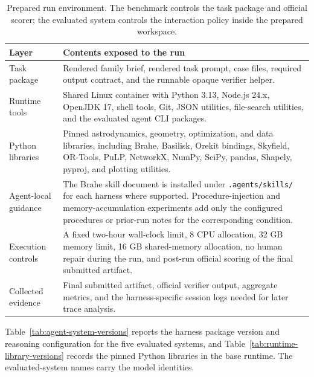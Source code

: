 \documentclass[]{mosi}
\begin{document}
\begin{table}[!t]
\centering
\footnotesize
\setlength{\tabcolsep}{4pt}
\begin{tabular}{>{\raggedright\arraybackslash}p{}>{\raggedright\arraybackslash}p{}}
\hline
\textbf{Layer} & \textbf{Contents exposed to the run} \\
\hline
Task package & Rendered family brief, rendered task prompt, case files, required output contract, and the runnable opaque verifier helper. \\
Runtime tools & Shared Linux container with Python 3.13, Node.js 24.x, OpenJDK 17, shell tools, Git, JSON utilities, file-search utilities, and the evaluated agent CLI packages. \\
Python libraries & Pinned astrodynamics, geometry, optimization, and data libraries, including Brahe, Basilisk, Orekit bindings, Skyfield, OR-Tools, PuLP, NetworkX, NumPy, SciPy, pandas, Shapely, pyproj, and plotting utilities. \\
Agent-local guidance & The Brahe skill document is installed under \texttt{.agents/skills/} for each harness where supported. Procedure-injection and memory-accumulation experiments add only the configured procedures or prior-run notes for the corresponding condition. \\
Execution controls & A fixed two-hour wall-clock limit, 8 CPU allocation, 32 GB memory limit, 16 GB shared-memory allocation, no human repair during the run, and post-run official scoring of the final submitted artifact. \\
Collected evidence & Final submitted artifact, official verifier output, aggregate metrics, and the harness-specific session logs needed for later trace analysis. \\
\hline
\end{tabular}
\caption{Prepared run environment. The benchmark controls the task package and official scorer; the evaluated system controls the interaction policy inside the prepared workspace.}
\label{tab:workspace-environment}
\end{table}

Table~\ref{tab:agent-system-versions} reports the harness package version and reasoning configuration for the five evaluated systems, and Table~\ref{tab:runtime-library-versions} records the pinned Python libraries in the base runtime. The evaluated-system names carry the model identities.
\end{document}
